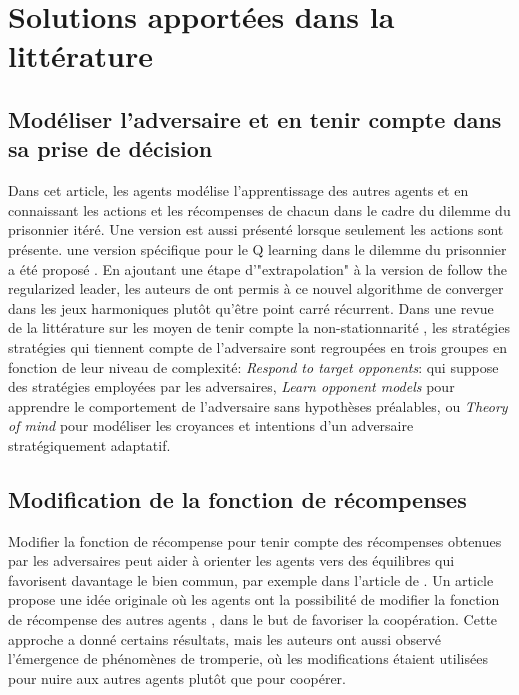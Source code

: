 \documentclass{article}
\theoremstyle{definition}
\begin{document}
\section{Solutions apportées dans la littérature}

\subsection{Modéliser l'adversaire et en tenir compte dans sa prise de décision}
\citet{foerster_learning_2018} Dans cet article, les agents modélise l'apprentissage des autres agents et en connaissant les actions et les récompenses de chacun dans le cadre du dilemme du prisonnier itéré. Une version est aussi présenté lorsque seulement les actions sont présente.
une version spécifique pour le Q learning dans le dilemme du prisonnier a été proposé \citet{aghajohari_loqa_2024}. En ajoutant une étape d'"extrapolation" à la version de follow the regularized leader, les auteurs de \citet{legacci_no-regret_2024} ont permis à ce nouvel algorithme de converger dans les jeux harmoniques plutôt qu'être point carré récurrent. 
Dans une revue de la littérature sur les moyen de tenir compte la non-stationnarité \citet{hernandez-leal_survey_2019}, les stratégies stratégies qui tiennent compte de l'adversaire sont regroupées en trois groupes en fonction de leur niveau de complexité: \textit{Respond to target opponents}: qui suppose des stratégies employées par les adversaires, 
\textit{Learn opponent models} pour apprendre le comportement de l’adversaire sans hypothèses préalables, ou \textit{Theory of mind} pour modéliser les croyances et intentions d’un adversaire stratégiquement adaptatif.

\subsection{Modification de la fonction de récompenses}
Modifier la fonction de récompense pour tenir compte des récompenses obtenues par les adversaires peut aider à orienter les agents vers des équilibres qui favorisent davantage le bien commun, par exemple dans l'article de \citet{hughes_inequity_2018}.
Un article propose une idée originale où les agents ont la possibilité de modifier la fonction de récompense des autres agents \citet{chelarescu_deception_2021}, dans le but de favoriser la coopération. Cette approche a donné certains résultats, mais les auteurs ont aussi observé l’émergence de phénomènes de tromperie, où les modifications étaient utilisées pour nuire aux autres agents plutôt que pour coopérer.
\end{document}
